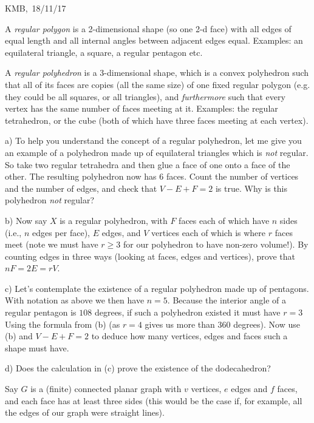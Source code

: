 \documentclass[10pt]{article}
\begin{document}
\begin{flushright} KMB,\ 18/11/17\end{flushright}


\medskip{} A \emph{regular polygon} is a 2-dimensional shape (so one 2-d face) with all edges of equal length and all internal angles between adjacent edges equal. Examples: an equilateral triangle, a square, a regular pentagon etc.

A \emph{regular polyhedron} is a 3-dimensional shape, which is a convex polyhedron such that all of its faces are copies (all the same size) of one fixed regular polygon (e.g. they could be all squares, or all triangles), and \emph{furthermore} such that every vertex has the same number of faces meeting at it. Examples: the regular tetrahedron, or the cube (both of which have three faces meeting at each vertex).

a) To help you understand the concept of a regular polyhedron, let me give you an example of a polyhedron made up of equilateral triangles which is \emph{not} regular. So take two regular tetrahedra and then glue a face of one onto a face of the other. The resulting polyhedron now has 6 faces. Count the number of vertices and the number of edges, and check that $V-E+F=2$ is true. Why is this polyhedron \emph{not} regular?

b) Now say $X$ is a regular polyhedron, with $F$ faces each of which have $n$ sides (i.e., $n$ edges per face), $E$ edges, and $V$ vertices each of which is where $r$ faces meet (note we must have $r\geq3$ for our polyhedron to have non-zero volume!). By counting edges in three ways (looking at faces, edges and vertices), prove that $nF=2E=rV$.

c) Let's contemplate the existence of a regular polyhedron made up of pentagons. With notation as above we then have $n=5$. Because the interior angle of a regular pentagon is $108$ degrees, if such a polyhedron existed it must have $r=3$ Using the formula from (b) (as $r=4$ gives us more than 360 degrees). Now use (b) and $V-E+F=2$ to deduce how many vertices, edges and faces such a shape must have.

d) Does the calculation in (c) prove the existence of the dodecahedron?

\medskip{} Say $G$ is a (finite) connected planar graph with $v$ vertices, $e$ edges and $f$ faces, and each face has at least three sides (this would be the case if, for example, all the edges of our graph were straight lines). 
\end{document}
